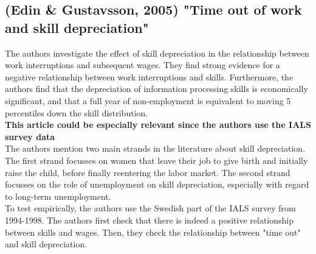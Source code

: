 \documentclass[12pt,a4paper]{article}
\begin{document}
  \subsection{(Edin \& Gustavsson, 2005) "Time out of work and skill depreciation"} %
  \label{sub:edin}
  The authors investigate the effect of skill depreciation in the relationship between work interruptions and 
  subsequent wages. They find strong evidence for a negative relationship between work interruptions and skills.
  Furthermore, the authors find that the depreciation of information processing skills is economically significant,
  and that a full year of non-employment is equivalent to moving 5 percentiles down the skill distribution.\\
  \textbf{This article could be especially relevant since the authors use the IALS survey data}\\
  The authors mention two main strands in the literature about skill depreciation. The first strand focusses on
  women that leave their job to give birth and initially raise the child, before finally reentering the labor
  market. The second strand focusses on the role of unemployment on skill depreciation, especially with regard
  to long-term unemployment.\\
  To test empirically, the authors use the Swedish part of the IALS survey from 1994-1998. The authors first check
  that there is indeed a positive relationship between skills and wages. Then, they check the relationship between
  "time out" and skill depreciation.\\
  
\end{document}
